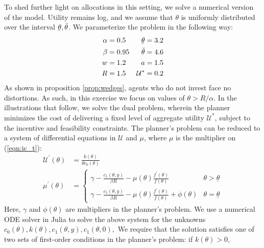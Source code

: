 \documentclass[11pt]{article}
\newcommand{\ubar}[1]{\underaccent{\bar}{#1}}
\begin{document}
To shed further light on allocations in this setting, we solve a numerical version of the model. Utility remains log, and we assume that \( \theta \) is uniformly distributed over the interval \( \ubar{\theta}, \bar{\theta} \). We parameterize the problem in the following way:
\begin{align*}
    \alpha &= 0.5 & \ubar{\theta} &= 3.2 \\
    \beta &= 0.95 & \bar{\theta} &= 4.6 \\
    w &= 1.2 & a &= 1.5 \\
    R &= 1.5 & \mathcal{U}^* &= 0.2
\end{align*}
As shown in proposition \ref{prop:wedges}, agents who do not invest face no distortions. As such, in this exercise we focus on values of \( \theta>R/\alpha \). In the illustrations that follow, we solve the dual problem, wherein the planner minimizes the cost of delivering a fixed level of aggregate utility \( \mathcal{U}^* \), subject to the incentive and feasibility constraints. The planner's problem can be reduced to a system of differential equations in \( \mathcal{U} \) and \( \mu \), where \( \mu \) is the multiplier on (\ref{eqn:ic_t}):
\begin{align*}
    \mathcal{U}^{\prime}\left(\theta\right)&=\frac{k\left(\theta\right)}{\theta c_{0}\left(\theta\right)}\\\mu^{\prime}\left(\theta\right)&=\begin{cases}
        \gamma-\frac{c_{1}\left(\theta,y\right)}{\beta R}-\mu\left(\theta\right)\frac{f^{\prime}\left(\theta\right)}{f\left(\theta\right)} & \theta>\underline{\theta}\\
        \gamma-\frac{c_{1}\left(\theta,y\right)}{\beta R}-\mu\left(\theta\right)\frac{f^{\prime}\left(\theta\right)}{f\left(\theta\right)}+\phi\left(\theta\right) & \theta=\underline{\theta}
        \end{cases}
\end{align*}
Here, \( \gamma \) and \( \phi\left( \theta \right) \) are multipliers in the planner's problem. We use a numerical ODE solver in Julia to solve the above system for the unknowns \( c_0\left( \theta \right), k\left( \theta \right), c_1\left( \theta,y \right), c_1\left( \theta, 0 \right),  \) We require that the solution satisfies one of two sets of first-order conditions in the planner's problem: if \( k\left( \theta \right) > 0 \),
\end{document}
